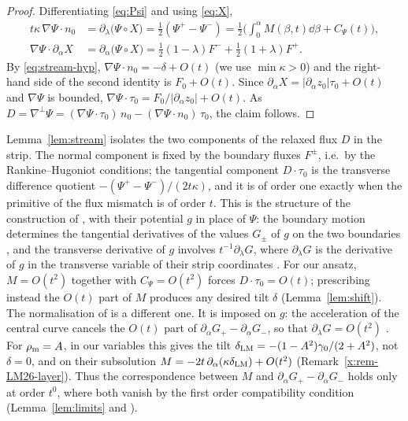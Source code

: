 \begin{proof}
Differentiating \eqref{eq:Psi} and using \eqref{eq:X},
\begin{align*}
t\kappa\,\nabla\Psi\cdot n_0&=\partial_\lambda\big(\Psi\circ X\big)=\tfrac12(\Psi^+-\Psi^-)=\tfrac12\Big(\int_0^\alpha M(\beta,t)\dd\beta+C_\Psi(t)\Big),\\
\nabla\Psi\cdot\partial_\alpha X&=\partial_\alpha\big(\Psi\circ X\big)=\tfrac12(1-\lambda)F^-+\tfrac12(1+\lambda)F^+ .
\end{align*}
By \eqref{eq:stream-hyp}, $\nabla\Psi\cdot n_0=-\delta+O(t)$ (we use $\min\kappa>0$) and the right-hand side of the second identity is $F_0+O(t)$. Since
$\partial_\alpha X=|\partial_\alpha z_0|\tau_0+O(t)$ and $\nabla\Psi$ is bounded, $\nabla\Psi\cdot\tau_0=F_0/|\partial_\alpha z_0|+O(t)$. As
$D=\nabla^\perp\Psi=(\nabla\Psi\cdot\tau_0)\,n_0-(\nabla\Psi\cdot n_0)\,\tau_0$, the claim follows.
\end{proof}

\begin{remark}\label{rem:tilt}
Lemma~\ref{lem:stream} isolates the two components of the relaxed flux $D$ in the strip. The normal component is fixed by the boundary fluxes $F^\pm$, i.e.\ by the Rankine--Hugoniot conditions;
the tangential component $D\cdot\tau_0$ is the transverse difference quotient $-(\Psi^+-\Psi^-)/(2t\kappa)$, and it is of order one exactly when the primitive of the flux mismatch is of order $t$.
This is the structure of the construction of \cite{LM26}, with their potential $g$ in place of $\Psi$: the boundary motion determines the tangential derivatives of the values $G_\pm$ of $g$ on
the two boundaries \cite[Sec.~3.3.1 and (4.12)]{LM26}, and the transverse derivative of $g$ involves $t^{-1}\partial_\lambda G$, where $\partial_\lambda G$ is the derivative of $g$ in the
transverse variable of their strip coordinates \cite[Sec.~3.3.4 and (4.11)]{LM26}.
For our ansatz, $M=O(t^2)$ together with $C_\Psi=O(t^2)$ forces $D\cdot\tau_0=O(t)$; prescribing instead the $O(t)$ part of $M$ produces any desired tilt $\delta$ (Lemma~\ref{lem:shift}).
The normalisation of \cite{LM26} is a different one. It is imposed on $g$: the acceleration of the central curve cancels the $O(t)$ part of $\partial_\alpha G_+-\partial_\alpha G_-$, so that
$\partial_\lambda G=O(t^2)$ \cite[Sec.~3.3.4, Lemma~5.3 and Prop.~7.2]{LM26}. For $\rho_{\mathrm m}=A$, in our variables this gives the tilt
$\delta_{\rm LM}=-(1-A^2)\gamma_0/(2+A^2)$, not $\delta=0$, and on their subsolution $M=-2t\,\partial_\alpha(\kappa\delta_{\rm LM})+O(t^2)$ (Remark~\ref{x:rem-LM26-layer}). Thus the
correspondence between $M$ and $\partial_\alpha G_+-\partial_\alpha G_-$ holds only at order $t^0$, where both vanish by the first order compatibility condition (Lemma~\ref{lem:limits} and
\cite[Lemma~5.2]{LM26}).
\end{remark}
